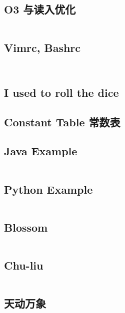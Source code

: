 \documentclass[titlepage, a4paper]{article}
\begin{document}
\begin{multicols}{2}
\begin{spacing}{0.6}
				\subsection{O3 与读入优化}
				\inputminted{cpp}{src/Miscellany/hack.cpp}
				\subsection{Vimrc, Bashrc}
				\inputminted{vim}{src/Miscellany/vimrc}
				\inputminted{sh}{src/Miscellany/bashrc}
				\subsection{I used to roll the dice}
				\texttt{}
				\subsection{Constant Table 常数表}
				
				\newpage
			\subsection*{Java Example}
				\inputminted{java}{src/Miscellany/Main2.java}
			\subsection*{Python Example}
				\inputminted{python}{src/Miscellany/test.py}
			\subsection*{Blossom}
				\inputminted{python}{src/TreeandGraph/Blossom.cpp}
			\subsection*{Chu-liu}
				\inputminted{cpp}{src/TreeandGraph/最小树形图.cpp}
			\subsection*{天动万象}
				\inputminted{cpp}{src/yzh/ByteCampA3.cpp}
		\end{spacing}
		\endgroup
	\end{multicols}
	
\end{document}

